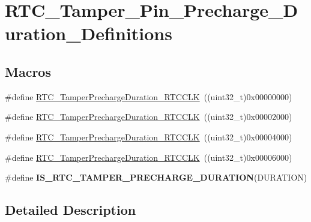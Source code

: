\hypertarget{group___r_t_c___tamper___pin___precharge___duration___definitions}{}\section{R\+T\+C\+\_\+\+Tamper\+\_\+\+Pin\+\_\+\+Precharge\+\_\+\+Duration\+\_\+\+Definitions}
\label{group___r_t_c___tamper___pin___precharge___duration___definitions}
\subsection*{Macros}
\begin{DoxyCompactItemize}
\item 
\#define \hyperlink{group___r_t_c___tamper___pin___precharge___duration___definitions_ga776e4f1a1a30d81e4333462ff49b10d6}{R\+T\+C\+\_\+\+Tamper\+Precharge\+Duration\+\_\+R\+T\+C\+C\+L\+K}~((uint32\+\_\+t)0x00000000)
\item 
\#define \hyperlink{group___r_t_c___tamper___pin___precharge___duration___definitions_gacd4ef118bfdfad143f4ca228c7a2dccb}{R\+T\+C\+\_\+\+Tamper\+Precharge\+Duration\+\_\+R\+T\+C\+C\+L\+K}~((uint32\+\_\+t)0x00002000)
\item 
\#define \hyperlink{group___r_t_c___tamper___pin___precharge___duration___definitions_gaaad3b9cb77e5218cc271e68b2f5e6b44}{R\+T\+C\+\_\+\+Tamper\+Precharge\+Duration\+\_\+R\+T\+C\+C\+L\+K}~((uint32\+\_\+t)0x00004000)
\item 
\#define \hyperlink{group___r_t_c___tamper___pin___precharge___duration___definitions_ga5b5b8e47db4271d3ab7e8ca16dbb645c}{R\+T\+C\+\_\+\+Tamper\+Precharge\+Duration\+\_\+R\+T\+C\+C\+L\+K}~((uint32\+\_\+t)0x00006000)
\item 
\#define {\bfseries I\+S\+\_\+\+R\+T\+C\+\_\+\+T\+A\+M\+P\+E\+R\+\_\+\+P\+R\+E\+C\+H\+A\+R\+G\+E\+\_\+\+D\+U\+R\+A\+T\+I\+O\+N}(D\+U\+R\+A\+T\+I\+O\+N)
\end{DoxyCompactItemize}


\subsection{Detailed Description}


